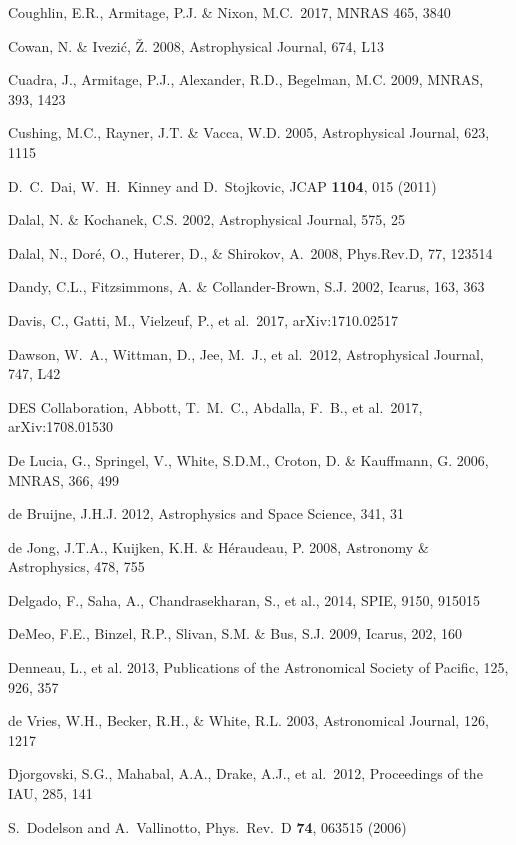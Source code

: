 \documentclass[twocolumn]{aastex61}
\begin{document}
\begin{thebibliography}{}
\bibitem[()]{} Coughlin, E.R., Armitage,  P.J. \&  Nixon, M.C.~2017, MNRAS 465, 3840

\bibitem[()]{} Cowan, N. \& Ivezi\'{c}, \v{Z}. 2008, Astrophysical Journal, 674, L13

\bibitem[()]{} Cuadra, J., Armitage, P.J., Alexander, R.D., Begelman, M.C. 2009, MNRAS, 393, 1423

\bibitem[()]{} Cushing, M.C., Rayner, J.T. \& Vacca, W.D. 2005, Astrophysical Journal, 623, 1115

\bibitem[()]{}  D.~C.~Dai, W.~H.~Kinney and D.~Stojkovic, JCAP {\bf 1104}, 015 (2011)

\bibitem[()]{} Dalal, N. \& Kochanek, C.S. 2002, Astrophysical Journal, 575, 25

\bibitem[()]{} Dalal, N., Dor{\'e}, O., Huterer, D., \& Shirokov, A.\ 2008, Phys.Rev.D, 77, 123514

\bibitem[()]{} Dandy, C.L., Fitzsimmons, A. \& Collander-Brown, S.J. 2002, Icarus, 163, 363

\bibitem[()]{} Davis, C., Gatti, M., Vielzeuf, P., et al.\ 2017, arXiv:1710.02517

\bibitem[()]{} Dawson, W.~A., Wittman, D., Jee, M.~J., et al.\ 2012, Astrophysical Journal, 747, L42

\bibitem[()]{} DES Collaboration, Abbott, T.~M.~C., Abdalla, F.~B., et al.\ 2017, arXiv:1708.01530

\bibitem[()]{} De Lucia, G., Springel, V., White, S.D.M., Croton, D. \& Kauffmann, G. 2006, MNRAS, 366, 499

\bibitem[()]{} de Bruijne, J.H.J. 2012, Astrophysics and Space Science, 341, 31

\bibitem[()]{} de Jong, J.T.A., Kuijken, K.H. \& H\'{e}raudeau, P. 2008, Astronomy \& Astrophysics, 478, 755

\bibitem[()]{} Delgado, F., Saha, A., Chandrasekharan, S., et al.,  2014,  SPIE, 9150, 915015

\bibitem[()]{} DeMeo, F.E., Binzel, R.P., Slivan, S.M. \& Bus, S.J. 2009, Icarus, 202, 160

\bibitem[()]{} Denneau, L., et al. 2013, Publications of the Astronomical Society of Pacific, 125,  926, 357

\bibitem[()]{} de Vries, W.H., Becker, R.H., \& White, R.L. 2003, Astronomical Journal, 126, 1217

\bibitem[()]{} Djorgovski, S.G., Mahabal, A.A., Drake, A.J., et al.~2012, Proceedings of the IAU, 285, 141

\bibitem[()]{} S.~Dodelson and A.~Vallinotto, Phys.\ Rev.\ D {\bf 74}, 063515 (2006)


\end{thebibliography}
\end{document}
